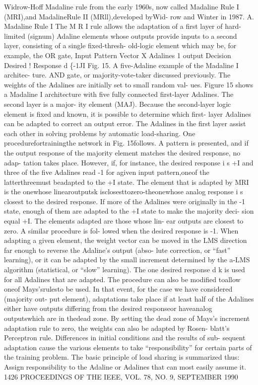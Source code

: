 Widrow-Hoff Madaline rule from the early 1960s, now called Madaline Rule
I (MRI),and MadalineRule II (MRll),developed byWid- row and Winter in
1987. A. Madaline Rule I The M R I rule allows the adaptation of a first
layer of hard- limited (signum) Adaline elements whose outputs provide
inputs to a second layer, consisting of a single fixed-thresh- old-logic
element which may be, for example, the OR gate, Input Pattern Vector X
Adalines 1 output Decision Desired ! Response d \{-1JI Fig. 15. A
five-Adaline example of the Madaline I architec- ture. AND gate, or
majority-vote-taker discussed previously. The weights of the Adalines
are initially set to small random val- ues. Figure 15 shows a Madaline I
architecture with five fully connected first-layer Adalines. The second
layer is a major- ity element (MAJ). Because the second-layer logic
element is fixed and known, it is possible to determine which first-
layer Adalines can be adapted to correct an output error. The Adalines
in the first layer assist each other in solving problems by automatic
load-sharing. One procedurefortrainingthe network in Fig. 15follows. A
pattern is presented, and if the output response of the majority element
matches the desired response, no adap- tation takes place. However, if,
for instance, the desired response i s +I and three of the five Adalines
read -1 for agiven input pattern,oneof the latterthreemust beadapted to
the +I state. The element that is adapted by MRI is the onewhose
linearoutputsk isclosesttozero-theonewhose analog response i s closest
to the desired response. If more of the Adalines were originally in the
-1 state, enough of them are adapted to the +I state to make the
majority deci- sion equal +I. The elements adapted are those whose lin-
ear outputs are closest to zero. A similar procedure is fol- lowed when
the desired response is -1. When adapting a given element, the weight
vector can be moved in the LMS direction far enough to reverse the
Adaline's output (abso- lute correction, or ``fast'' learning), or it
can be adapted by the small increment determined by the a-LMS algorithm
(statistical, or ``slow'' learning). The one desired response d k is
used for all Adalines that are adapted. The procedure can also be
modified toallow oneof Mays'srulesto be used. In that event, for the
case we have considered (majority out- put element), adaptations take
place if at least half of the Adalines either have outputs differing
from the desired responseor haveanalog outputswhich are in thedead zone.
By setting the dead zone of Mays's increment adaptation rule to zero,
the weights can also be adapted by Rosen- blatt's Perceptron rule.
Differences in initial conditions and the results of sub- sequent
adaptation cause the various elements to take ``responsibility'' for
certain parts of the training problem. The basic principle of load
sharing is summarized thus: Assign responsibility to the Adaline or
Adalines that can most easily assume it. 1426 PROCEEDINGS OF THE IEEE,
VOL. 78, NO. 9, SEPTEMBER 1990

